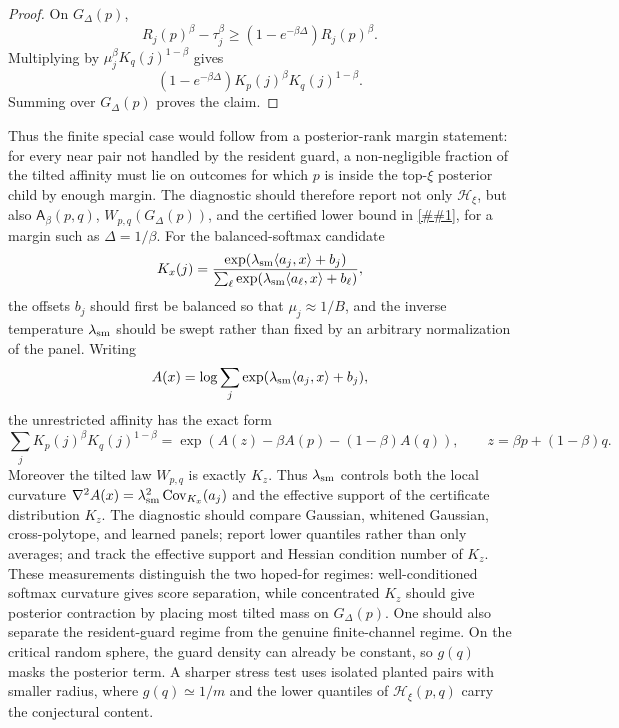 \documentclass[10pt]{article}
\newcommand{\cref}[1]{\ref{##1}}
\theoremstyle{definition}
\newcommand{\ip}[2]{\langle #1,#2\rangle}
\begin{document}
\begin{proof}
   On $G_\Delta(p)$,
   \[
      R_j(p)^\beta-\tau_j^\beta
      \ge (1-e^{-\beta\Delta})R_j(p)^\beta.
   \]
   Multiplying by $\mu_j^\beta K_q(j)^{1-\beta}$ gives
   \[
      (1-e^{-\beta\Delta})K_p(j)^\beta K_q(j)^{1-\beta}.
   \]
   Summing over $G_\Delta(p)$ proves the claim.
\end{proof}

Thus the finite special case would follow from a posterior-rank margin statement: for every near pair not handled by the resident guard, a non-negligible fraction of the tilted affinity must lie on outcomes for which $p$ is inside the top-$\xi$ posterior child by enough margin. The diagnostic should therefore report not only $\mathcal H_\xi$, but also $\mathsf A_\beta(p,q)$, $W_{p,q}(G_\Delta(p))$, and the certified lower bound in \cref{lem:posterior-rank-margin}, for a margin such as $\Delta=1/\beta$. For the balanced-softmax candidate
\[
   K_x(j)=
   \frac{\exp(\lambda_{\rm sm}\ip{a_j}{x}+b_j)}
   {\sum_\ell\exp(\lambda_{\rm sm}\ip{a_\ell}{x}+b_\ell)},
\]
the offsets $b_j$ should first be balanced so that $\mu_j\approx1/B$, and the inverse temperature $\lambda_{\rm sm}$ should be swept rather than fixed by an arbitrary normalization of the panel. Writing
\[
   A(x)=\log\sum_j\exp(\lambda_{\rm sm}\ip{a_j}{x}+b_j),
\]
the unrestricted affinity has the exact form
\[
   \sum_j K_p(j)^\beta K_q(j)^{1-\beta}
   =
   \exp\!\left(A(z)-\beta A(p)-(1-\beta)A(q)\right),
   \qquad z=\beta p+(1-\beta)q.
\]
Moreover the tilted law $W_{p,q}$ is exactly $K_z$. Thus $\lambda_{\rm sm}$ controls both the local curvature $\nabla^2A(x)=\lambda_{\rm sm}^2\operatorname{Cov}_{K_x}(a_j)$ and the effective support of the certificate distribution $K_z$. The diagnostic should compare Gaussian, whitened Gaussian, cross-polytope, and learned panels; report lower quantiles rather than only averages; and track the effective support and Hessian condition number of $K_z$. These measurements distinguish the two hoped-for regimes: well-conditioned softmax curvature gives score separation, while concentrated $K_z$ should give posterior contraction by placing most tilted mass on $G_\Delta(p)$.
One should also separate the resident-guard regime from the genuine finite-channel regime. On the critical random sphere, the guard density can already be constant, so $g(q)$ masks the posterior term. A sharper stress test uses isolated planted pairs with smaller radius, where $g(q)\simeq1/m$ and the lower quantiles of $\mathcal H_\xi(p,q)$ carry the conjectural content.
\end{document}
